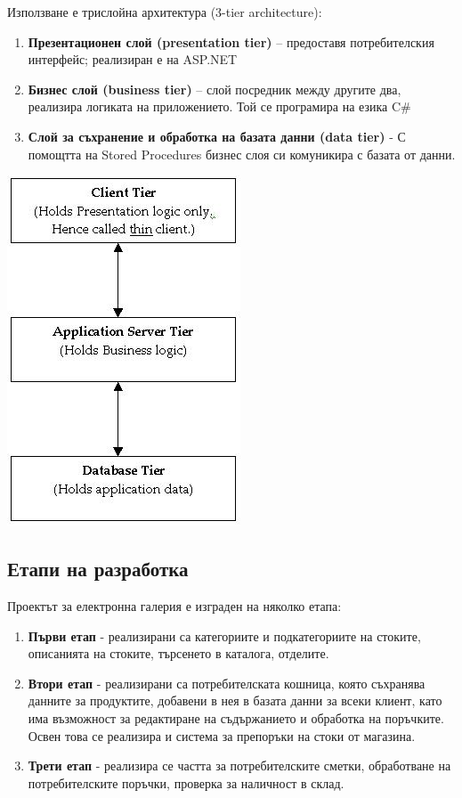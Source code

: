 \documentclass[a4paper,14pt]{article}
\begin{document}
Използване е трислойна архитектура (3-tier architecture):
\begin{enumerate}
\item
\textbf{Презентационен слой (presentation tier)} – предоставя потребителския интерфейс; реализиран е на ASP.NET
\item
\textbf{Бизнес слой (business tier)} – слой посредник между другите два, реализира логиката на приложението. Той се програмира на езика C\#
\item
\textbf{Слой за съхранение и обработка на базата данни (data tier)} -  С помощтта на Stored Procedures бизнес слоя си комуникира с базата от данни.
\end{enumerate}
\includegraphics{21}



\subsection{Етапи на разработка}

Проектът за електронна галерия е изграден на няколко етапа:
\begin{enumerate}
\item
\textbf{Първи етап} - реализирани са категориите и подкатегориите на стоките, описанията на стоките, търсенето в каталога, отделите.
\item
\textbf{Втори етап} - реализирани са потребителската кошница, която съхранява данните за продуктите, добавени в нея в базата данни за всеки клиент, като има възможност за редактиране на съдържанието и обработка на поръчките. Освен това се реализира и система за препоръки на стоки от магазина.

\item
\textbf{Трети етап} - реализира се частта за потребителските сметки, обработване на потребителските поръчки, проверка за наличност в склад.
\end{enumerate}
\end{document}
